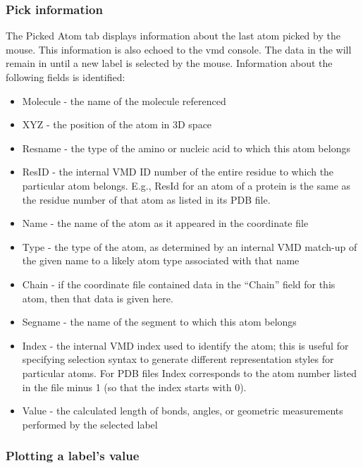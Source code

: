 \subsubsection{Pick information}

The {\sf Picked Atom} tab displays
information about the last atom picked by the mouse.  This information
is also echoed to the vmd console.  The data in the will
remain in until a new label is selected by the mouse.
Information about the following fields is identified:

\begin{itemize}
\item Molecule - the name of the molecule referenced
\item XYZ - the position of the atom in 3D space
\item Resname - the type of the amino or nucleic acid to which this atom
belongs
\item ResID - the internal VMD ID number of the entire residue to which
the particular atom belongs. E.g., ResId for an atom of a protein is the
same as the residue number of that atom as listed in its PDB file.
\item Name - the name of the atom as it appeared in the coordinate file
\item Type - the type of the atom, as determined by an internal VMD match-up
of the given name to a likely atom type associated with that name
\item Chain - if the coordinate file contained data in the ``Chain'' field
for this atom, then that data is given here.
\item Segname - the name of the segment to which this atom belongs
\item Index - the internal VMD index used to identify the atom; this is
useful for specifying selection syntax to generate different
representation styles for particular atoms. For PDB files Index corresponds
to the atom number listed in the file minus 1 (so that the index starts with
0).
\item Value - the calculated length of bonds, angles, or 
      geometric measurements performed by the selected label
\end{itemize}


\subsubsection{Plotting a label's value}
\label{ug:ui:window:labels:plotting}

